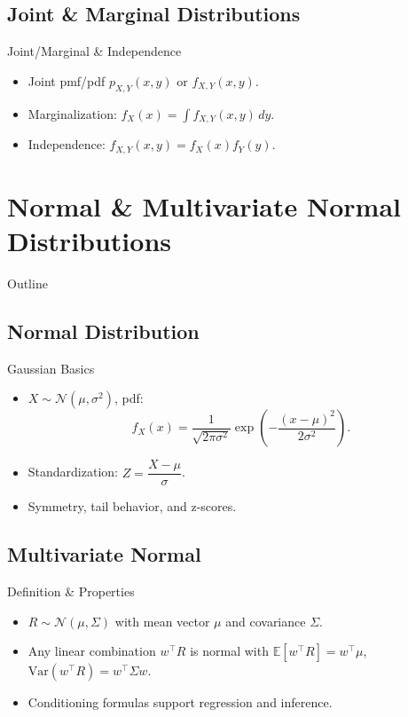 \documentclass[aspectratio=169]{beamer}
\begin{document}
\subsection{Joint \& Marginal Distributions}
\begin{frame}{Joint/Marginal \& Independence}
\begin{itemize}
  \item Joint pmf/pdf \(p_{X,Y}(x,y)\) or \(f_{X,Y}(x,y)\).
  \item Marginalization: \(f_X(x)=\int f_{X,Y}(x,y)\,dy\).
  \item Independence: \(f_{X,Y}(x,y)=f_X(x)f_Y(y)\).
\end{itemize}
\end{frame}

\section{Normal \& Multivariate Normal Distributions}

\begin{frame}{Outline}
\end{frame}

\subsection{Normal Distribution}
\begin{frame}{Gaussian Basics}
\begin{itemize}
  \item \(X\sim \mathcal{N}(\mu,\sigma^2)\), pdf:
  \[
  f_X(x)=\frac{1}{\sqrt{2\pi\sigma^2}}
  \exp\!\left(-\frac{(x-\mu)^2}{2\sigma^2}\right).
  \]
  \item Standardization: \(Z=\dfrac{X-\mu}{\sigma}\).
  \item Symmetry, tail behavior, and z-scores.
\end{itemize}
\end{frame}

\subsection{Multivariate Normal}
\begin{frame}{Definition \& Properties}
\begin{itemize}
  \item \(R\sim \mathcal{N}(\mu,\Sigma)\) with mean vector \(\mu\) and covariance \(\Sigma\).
  \item Any linear combination \(w^\top R\) is normal with
    \(\mathbb{E}[w^\top R]=w^\top\mu\), \(\mathrm{Var}(w^\top R)=w^\top\Sigma w\).
  \item Conditioning formulas support regression and inference.
\end{itemize}
\end{frame}
\end{document}
